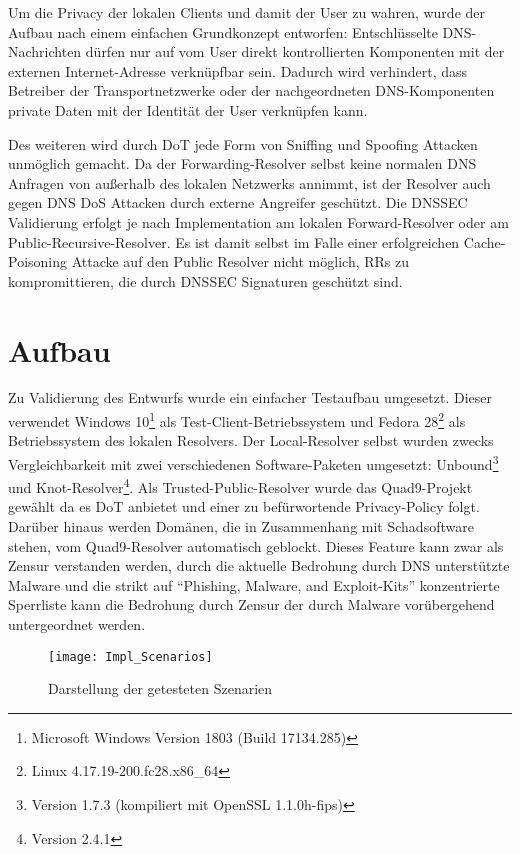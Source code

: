 Um die Privacy der lokalen Clients und damit der User zu wahren, wurde der Aufbau nach einem einfachen Grundkonzept entworfen: Entschlüsselte DNS-Nachrichten dürfen nur auf vom User direkt kontrollierten Komponenten mit der externen Internet-Adresse verknüpfbar sein. Dadurch wird verhindert, dass Betreiber der Transportnetzwerke oder der nachgeordneten DNS-Komponenten private Daten mit der Identität der User verknüpfen kann.

Des weiteren wird durch DoT jede Form von Sniffing und Spoofing Attacken unmöglich gemacht. Da der Forwarding-Resolver selbst keine normalen DNS Anfragen von außerhalb des lokalen Netzwerks annimmt, ist der Resolver auch gegen DNS DoS Attacken durch externe Angreifer geschützt. Die \ac{DNSSEC} Validierung erfolgt je nach Implementation am lokalen Forward-Resolver oder am Public-Recursive-Resolver. Es ist damit selbst im Falle einer erfolgreichen Cache-Poisoning Attacke auf den Public Resolver nicht möglich, RRs zu kompromittieren, die durch \ac{DNSSEC} Signaturen geschützt sind.

\section{Aufbau}
\label{sec:architecture}
Zu Validierung des Entwurfs wurde ein einfacher Testaufbau umgesetzt. Dieser verwendet Windows 10\footnote{Microsoft Windows Version 1803 (Build 17134.285)} als Test-Client-Betriebssystem und Fedora 28\footnote{Linux 4.17.19-200.fc28.x86\_64} als Betriebssystem des lokalen Resolvers. Der Local-Resolver selbst wurden zwecks Vergleichbarkeit mit zwei verschiedenen Software-Paketen umgesetzt: Unbound\footnote{Version 1.7.3 (kompiliert mit OpenSSL 1.1.0h-fips)} und Knot-Resolver\footnote{Version 2.4.1}. Als Trusted-Public-Resolver wurde das Quad9-Projekt gewählt da es DoT anbietet und einer zu befürwortende Privacy-Policy\cite{Quad9Privacy} folgt. Darüber hinaus werden Domänen, die in Zusammenhang mit Schadsoftware stehen, vom Quad9-Resolver automatisch geblockt. Dieses Feature kann zwar als Zensur verstanden werden, durch die aktuelle Bedrohung durch DNS unterstützte Malware \cite{Alcoy2017} und die strikt auf ``Phishing, Malware, and Exploit-Kits'' konzentrierte Sperrliste\cite{Quad9FAQ} kann die Bedrohung durch Zensur der durch Malware vorübergehend untergeordnet werden.   
\begin{wrapfigure}{r}{0.5\textwidth}
    \begin{center}
    \texttt{[image: Impl\_Scenarios]}
    \end{center}
    \caption{Darstellung der getesteten Szenarien}
    \label{img:impl-scenarios}
\end{wrapfigure}


